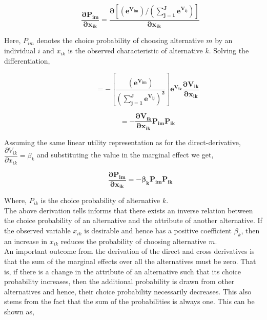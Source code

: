 \documentclass[a4paper,11pt]{article}
\begin{document}
        \begin{equation*}
            \qquad \mathbf{\dfrac{\partial P_{im}}{\partial x_{ik}} = \dfrac{\partial \left[\left(e^{V_{im}}\right) \bigg/ \left(\sum_{j=1}^{J}e^{V_{ij}}\right)\right]}{\partial x_{ik}}}
        \end{equation*}

        Here, $P_{im}$ denotes the choice probability of choosing alternative $m$ by an individual $i$ and $x_{ik}$ is the observed characteristic of alternative $k$. Solving the differentiation,

        \begin{equation*}
            \qquad \qquad \mathbf{ = - \left[\dfrac{\left(e^{V_{im}}\right)} {\left(\sum_{j=1}^{J}e^{V_{ij}}\right)^2}\right] e^{V_{ik}} \dfrac{\partial V_{ik}}{\partial x_{ik}}}
        \end{equation*}

        \begin{equation*}
            \qquad \qquad \mathbf{ = - \dfrac{\partial V_{ik}}{\partial x_{ik}} P_{im} P_{ik}}
        \end{equation*}

        Assuming the same linear utility representation as for the direct-derivative, $\dfrac{\partial V_{ik}}{\partial x_{ik}} = \beta_{k}$ and substituting the value in the marginal effect we get,

        \begin{equation*}
            \qquad \mathbf{\dfrac{\partial P_{im}}{\partial x_{ik}} = - \beta_{k} P_{im} P_{ik}}
        \end{equation*}

        Where, $P_{ik}$ is the choice probability of alternative $k$.\\
        
        The above derivation tells informs that there exists an inverse relation between the choice probability of an alternative and the attribute of another alternative. If the observed variable $x_{ik}$ is desirable and hence has a positive coefficient $\beta_{k}$, then an increase in $x_{ik}$ reduces the probability of choosing alternative $m$.\\

        An important outcome from the derivation of the direct and cross derivatives is that the sum of the marginal effects over all the alternatives must be zero. That is, if there is a change in the attribute of an alternative such that its choice probability increases, then the additional probability is drawn from other alternatives and hence, their choice probability necessarily decreases. This also stems from the fact that the sum of the probabilities is always one. This can be shown as,
\end{document}
